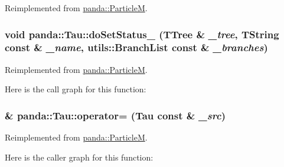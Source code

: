 Reimplemented from \hyperlink{classpanda_1_1ParticleM_ab54d46a237f8d12074ee36c48af33b04}{panda::ParticleM}.\hypertarget{classpanda_1_1Tau_a96eda4638f1fd6968f3a31757253600e}{
\subsubsection[{doSetStatus\_\-}]{\setlength{\rightskip}{0pt plus 5cm}void panda::Tau::doSetStatus\_\- (TTree \& {\em \_\-tree}, \/  TString const \& {\em \_\-name}, \/  {\bf utils::BranchList} const \& {\em \_\-branches})}}
\label{classpanda_1_1Tau_a96eda4638f1fd6968f3a31757253600e}


Reimplemented from \hyperlink{classpanda_1_1ParticleM_a042f9e295576be022960ea88144e9022}{panda::ParticleM}.

Here is the call graph for this function:\hypertarget{classpanda_1_1Tau_a1482f04be4fffde6b5c648ae3e7b539f}{
\subsubsection[{operator=}]{ \& panda::Tau::operator= ({\bf Tau} const \& {\em \_\-src})}}
\label{classpanda_1_1Tau_a1482f04be4fffde6b5c648ae3e7b539f}


Reimplemented from \hyperlink{classpanda_1_1ParticleM_a37f7be4e1150b6080b47b005af730af5}{panda::ParticleM}.

Here is the caller graph for this function:

